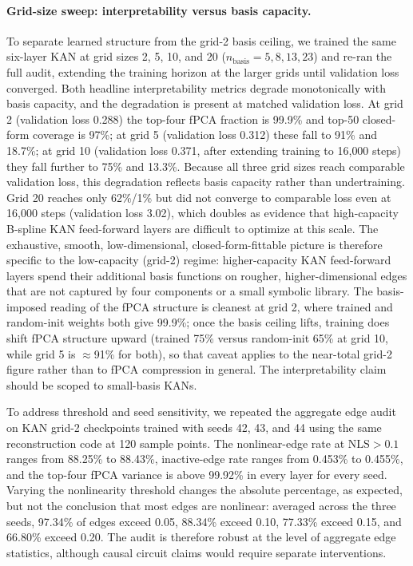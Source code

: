 \documentclass{article}
\newcommand{\nls}{\mathrm{NLS}}
\begin{document}
\paragraph{Grid-size sweep: interpretability versus basis capacity.}
\label{sec:gridsweep}
To separate learned structure from the grid-2 basis ceiling, we trained the same six-layer KAN at grid sizes 2, 5, 10, and 20 (\(n_{\mathrm{basis}}=5,8,13,23\)) and re-ran the full audit, extending the training horizon at the larger grids until validation loss converged. Both headline interpretability metrics degrade monotonically with basis capacity, and the degradation is present at matched validation loss. At grid 2 (validation loss 0.288) the top-four fPCA fraction is 99.9\% and top-50 closed-form coverage is 97\%; at grid 5 (validation loss 0.312) these fall to 91\% and 18.7\%; at grid 10 (validation loss 0.371, after extending training to 16{,}000 steps) they fall further to 75\% and 13.3\%. Because all three grid sizes reach comparable validation loss, this degradation reflects basis capacity rather than undertraining. Grid 20 reaches only 62\%/1\% but did not converge to comparable loss even at 16{,}000 steps (validation loss 3.02), which doubles as evidence that high-capacity B-spline KAN feed-forward layers are difficult to optimize at this scale. The exhaustive, smooth, low-dimensional, closed-form-fittable picture is therefore specific to the low-capacity (grid-2) regime: higher-capacity KAN feed-forward layers spend their additional basis functions on rougher, higher-dimensional edges that are not captured by four components or a small symbolic library. The basis-imposed reading of the fPCA structure is cleanest at grid 2, where trained and random-init weights both give 99.9\%; once the basis ceiling lifts, training does shift fPCA structure upward (trained 75\% versus random-init 65\% at grid 10, while grid 5 is \(\approx\)91\% for both), so that caveat applies to the near-total grid-2 figure rather than to fPCA compression in general. The interpretability claim should be scoped to small-basis KANs.

To address threshold and seed sensitivity, we repeated the aggregate edge audit on KAN grid-2 checkpoints trained with seeds 42, 43, and 44 using the same reconstruction code at 120 sample points. The nonlinear-edge rate at \(\nls>0.1\) ranges from 88.25\% to 88.43\%, inactive-edge rate ranges from 0.453\% to 0.455\%, and the top-four fPCA variance is above 99.92\% in every layer for every seed. Varying the nonlinearity threshold changes the absolute percentage, as expected, but not the conclusion that most edges are nonlinear: averaged across the three seeds, 97.34\% of edges exceed 0.05, 88.34\% exceed 0.10, 77.33\% exceed 0.15, and 66.80\% exceed 0.20. The audit is therefore robust at the level of aggregate edge statistics, although causal circuit claims would require separate interventions.
\end{document}

